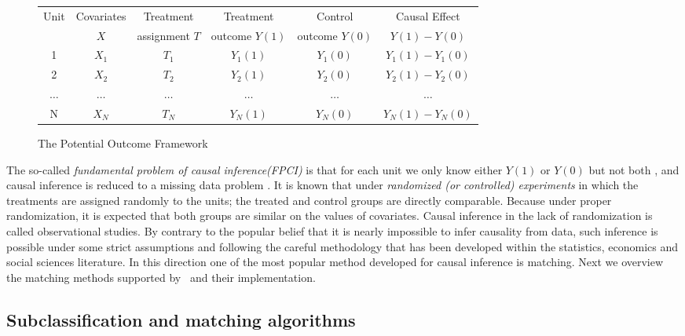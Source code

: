 \begin{figure}
  \centering
{\scriptsize
  \begin{tabular}{|c|c|c|c|c|c|} \hline
    Unit & Covariates & Treatment & Treatment & Control & Causal  Effect \\
   & $X$ & assignment $T$ & outcome $Y(1)$ & outcome $Y(0)$ & $Y(1)-Y(0)$ \\
    \hline
    1 & $X_1$ & $T_1$ & $Y_1(1)$ & $Y_1(0)$ & $Y_1(1) - Y_1(0)$ \\
    2 & $X_2$ & $T_2$ & $Y_2(1)$ & $Y_2(0)$ & $Y_2(1) - Y_2(0)$ \\
    $\ldots$ & $\ldots$ & $\ldots$ & $\ldots$ & $\ldots$ & $\ldots$ \\
    N & $X_N$ & $T_N$ & $Y_N(1)$ & $Y_N(0)$ & $Y_N(1) - Y_N(0)$ \\ \hline
  \end{tabular}
}
\caption{The Potential Outcome Framework~\cite{Rubin2005}}
  \label{fig:causal:inference}
  \vspace{-3mm}
\end{figure}
\noindent
The so-called {\em fundamental problem of causal inference(FPCI)} is that
for each unit we only know either $Y(1)$ or $Y(0)$ but not both
\cite{Holland1986}, and causal inference is reduced to a missing data
problem \cite{RosenbaumRubin1983}. It is known that under {\em randomized (or controlled) experiments} in which the treatments are assigned randomly to the units; the treated and control groups are directly comparable. Because under proper randomization, it is expected that both groups are similar on the values of covariates. Causal inference in the lack of randomization is called observational studies. By contrary  to the popular
belief that it is nearly impossible to infer causality from data, such inference is possible under some strict
assumptions and following the careful methodology that has been developed within the statistics, economics and social sciences literature. In this direction one of the most popular method developed for causal inference is matching. Next we overview the matching methods supported by \GSQL\ and their implementation.








\subsection{Subclassification and matching algorithms}


